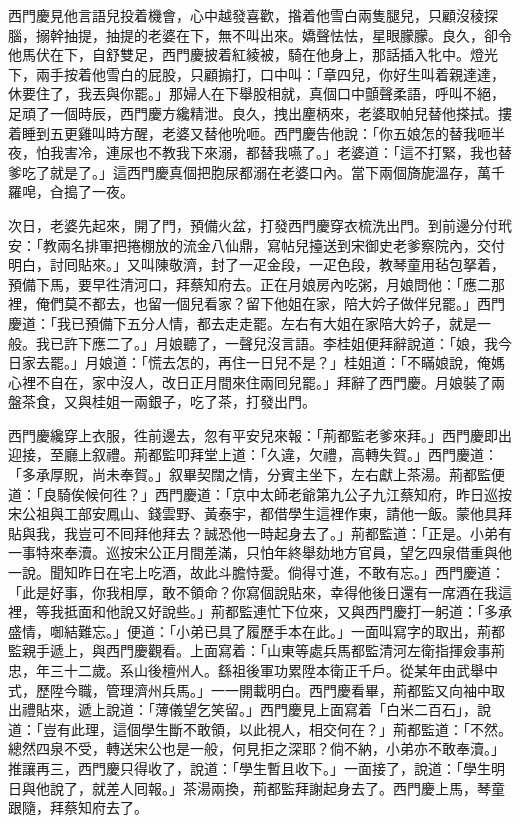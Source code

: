 西門慶見他言語兒投着機會，心中越發喜歡，揝着他雪白兩隻腿兒，{}只顧沒稜探腦，搦幹抽提，抽提的老婆在下，無不叫出來。嬌聲怯怯，星眼朦朦。良久，卻令他馬伏在下，自舒雙足，西門慶披着紅綾被，騎在他身上，那話插入牝中。燈光下，兩手按着他雪白的屁股，只顧搧打，口中叫：「章四兒，你好生叫着親達達，休要住了，我丟與你罷。」那婦人在下舉股相就，{}真個口中顫聲柔語，呼叫不絕，足頑了一個時辰，西門慶方纔精泄。良久，拽出麈柄來，老婆取帕兒替他搽拭。摟着睡到五更雞叫時方醒，老婆又替他吮咂。西門慶告他說：「你五娘怎的替我咂半夜，怕我害冷，連尿也不教我下來溺，都替我嚥了。」{}老婆道：「這不打緊，我也替爹吃了就是了。」{}這西門慶真個把胞尿都溺在老婆口內。{}當下兩個旖旎溫存，萬千羅唣，㒲搗了一夜。

次日，老婆先起來，開了門，預備火盆，打發西門慶穿衣梳洗出門。到前邊分付玳安：「教兩名排軍把捲棚放的流金八仙鼎，寫帖兒擡送到宋御史老爹察院內，交付明白，討囘貼來。」又叫陳敬濟，封了一疋金段，一疋色段，教琴童用毡包拏着，預備下馬，要早徃清河口，拜蔡知府去。正在月娘房內吃粥，月娘問他：「應二那裡，俺們莫不都去，也留一個兒看家？留下他姐在家，陪大妗子做伴兒罷。」西門慶道：「我已預備下五分人情，都去走走罷。左右有大姐在家陪大妗子，就是一般。我已許下應二了。」月娘聽了，一聲兒沒言語。李桂姐便拜辭說道：「娘，我今日家去罷。」月娘道：「慌去怎的，再住一日兒不是？」桂姐道：「不瞞娘說，俺媽心裡不自在，家中沒人，改日正月間來住兩囘兒罷。」拜辭了西門慶。月娘裝了兩盤茶食，又與桂姐一兩銀子，吃了茶，打發出門。

西門慶纔穿上衣服，徃前邊去，忽有平安兒來報：「荊都監老爹來拜。」西門慶即出迎接，至廳上叙禮。荊都監叩拜堂上道：「久違，欠禮，高轉失賀。」西門慶道：「多承厚貺，尚未奉賀。」叙畢契闊之情，分賓主坐下，左右獻上茶湯。荊都監便道：「良騎俟候何徃？」西門慶道：「京中太師老爺第九公子九江蔡知府，昨日巡按宋公祖與工部安鳳山、錢雲野、黃泰宇，都借學生這裡作東，請他一飯。蒙他具拜貼與我，我豈可不囘拜他拜去？誠恐他一時起身去了。」{}荊都監道：「正是。小弟有一事特來奉瀆。巡按宋公正月間差滿，只怕年終舉劾地方官員，望乞四泉借重與他一說。聞知昨日在宅上吃酒，故此斗膽恃愛。倘得寸進，不敢有忘。」西門慶道：「此是好事，你我相厚，敢不領命？你寫個說貼來，幸得他後日還有一席酒在我這裡，等我抵面和他說又好說些。」荊都監連忙下位來，又與西門慶打一躬道：「多承盛情，啣結難忘。」便道：「小弟已具了履歷手本在此。」一面叫寫字的取出，荊都監親手遞上，與西門慶觀看。上面寫着：「山東等處兵馬都監清河左衛指揮僉事荊忠，年三十二歲。系山後檀州人。繇祖後軍功累陞本衛正千戶。從某年由武舉中式，歷陞今職，管理濟州兵馬。」一一開載明白。西門慶看畢，荊都監又向袖中取出禮貼來，遞上說道：「薄儀望乞笑留。」{}西門慶見上面寫着「白米二百石」，說道：「豈有此理，這個學生斷不敢領，以此視人，相交何在？」荊都監道：「不然。總然四泉不受，轉送宋公也是一般，何見拒之深耶？倘不納，小弟亦不敢奉瀆。」推讓再三，西門慶只得收了，說道：「學生暫且收下。」一面接了，說道：「學生明日與他說了，就差人囘報。」茶湯兩換，荊都監拜謝起身去了。西門慶上馬，琴童跟隨，拜蔡知府去了。

